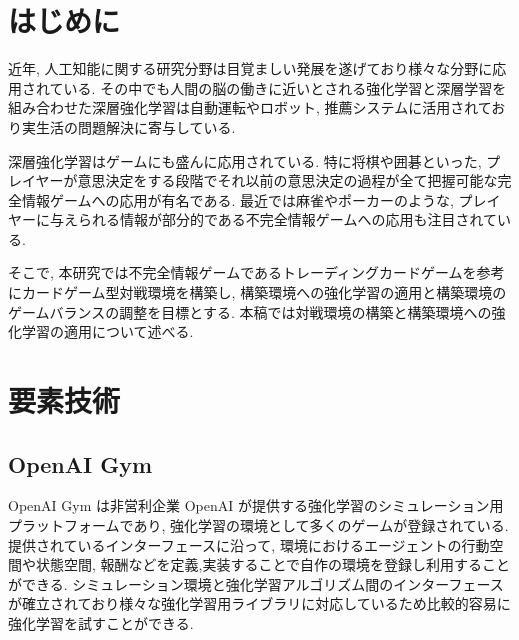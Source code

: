 \documentclass[twocolumn]{jarticle}
\begin{document}

\section{はじめに}
近年, 人工知能に関する研究分野は目覚ましい発展を遂げており様々な分野に応用されている. その中でも人間の脳の働きに近いとされる強化学習と深層学習を組み合わせた深層強化学習は自動運転やロボット, 推薦システムに活用されており実生活の問題解決に寄与している.\par
深層強化学習はゲームにも盛んに応用されている.
特に将棋や囲碁といった, プレイヤーが意思決定をする段階でそれ以前の意思決定の過程が全て把握可能な完全情報ゲームへの応用が有名である. 
最近では麻雀やポーカーのような, プレイヤーに与えられる情報が部分的である不完全情報ゲームへの応用も注目されている.
\par
そこで, 本研究では不完全情報ゲームであるトレーディングカードゲームを参考にカードゲーム型対戦環境を構築し, 構築環境への強化学習の適用と構築環境のゲームバランスの調整を目標とする. 本稿では対戦環境の構築と構築環境への強化学習の適用について述べる.

\section{要素技術}

\subsection{OpenAI Gym}
OpenAI Gym \cite{OpenAIGym} は非営利企業 OpenAI が提供する強化学習のシミュレーション用プラットフォームであり, 強化学習の環境として多くのゲームが登録されている. 提供されているインターフェースに沿って, 環境におけるエージェントの行動空間や状態空間, 報酬などを定義,実装することで自作の環境を登録し利用することができる. シミュレーション環境と強化学習アルゴリズム間のインターフェースが確立されており様々な強化学習用ライブラリに対応しているため比較的容易に強化学習を試すことができる.
\end{document}
